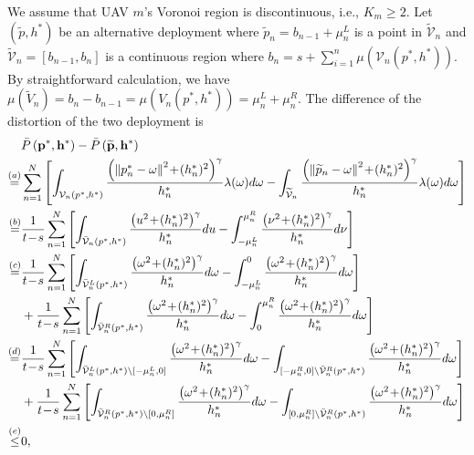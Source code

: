 \documentclass[smallabstract,smallcaptions]{dccpaper}
\newcommand{\df}{\ensuremath{\lam}}         %
\newcommand{\bP}{\ensuremath{\vp}}          %
\newcommand{\abPo}{\ensuremath{\bar{P}}}  %
\newcommand{\bH}{\ensuremath{\vh}}          %
\newcommand{\Vor}{\ensuremath{\mathcal{V}}}         %
\begin{document}
We assume that UAV $m$'s Voronoi region is discontinuous, i.e., $K_m\ge2$.  Let $(\widetilde{p},h^*)$ be an alternative
deployment where $\widetilde{p}_n=b_{n-1}+\mu^L_{n}$ is a point in $\widetilde{\Vor}_n$ and
$\widetilde{\Vor}_{n}=[b_{n-1}, b_n]$ is a continuous region where
$b_n=s+\sum_{i=1}^{n}\mu\left({\Vor}_{n}(p^*,h^*)\right)$.  By straightforward calculation, we have
$\mu(\widetilde{V}_{n})=b_n-b_{n-1}=\mu({V}_{n}(p^*,h^*))=\mu^L_n+\mu^R_n$.  The difference of the distortion of the two
deployment is
%
\begin{equation}
\begin{aligned}
    &\abPo\left(\bP^*,\bH^*\right) - \abPo\left(\widetilde{\bP},\bH^*\right)\\
    \overset{(a)}{=}&\sum_{n=1}^{N}\left[\int_{\Vor_n\left(p^*, h^*\right)}  \frac{ \left(\Norm{p^*_n- \ome}^2 \!+\!(h^*_n)^2\right)^{\gam}}{h^*_n} \df(\ome)d\ome-\int_{\widetilde{\Vor}_{n}} \frac{ \left(\Norm{\widetilde{p}_n- \ome}^2 \!+\!(h^*_n)^2\right)^{\gam}}{h^*_n} \df(\ome)d\ome\right]\\
    \overset{(b)}{=}&\frac{1}{t\!-\!s}\sum_{n=1}^{N}\left[\int_{\bar{\Vor}_n\left(p^*, h^*\right)}  \frac{ \left(u^2 \!+\!(h^*_n)^2\right)^{\gam}}{h^*_n} du-\int_{-\mu^L_n}^{\mu^R_n} \frac{ \left(\nu^2 \!+\!(h^*_n)^2\right)^{\gam}}{h^*_n} d\nu\right]\\
    \overset{(c)}{=}&\frac{1}{t\!-\!s}\sum_{n=1}^{N}\left[\int_{\bar{\Vor}^L_n\left(p^*, h^*\right)}  \frac{ \left(\ome^2 \!+\!(h^*_n)^2\right)^{\gam}}{h^*_n} d\ome-\int_{-\mu^L_n}^{0} \frac{ \left(\ome^2 \!+\!(h^*_n)^2\right)^{\gam}}{h^*_n} d\ome\right]\\
    &+\frac{1}{t\!-\!s}\sum_{n=1}^{N}\left[\int_{\bar{\Vor}^R_n\left(p^*, h^*\right)}  \frac{ \left(\ome^2 \!+\!(h^*_n)^2\right)^{\gam}}{h^*_n} d\ome-\int_{0}^{\mu^R_n} \frac{ \left(\ome^2 \!+\!(h^*_n)^2\right)^{\gam}}{h^*_n} d\ome\right]\\
    \overset{(d)}{=}&\frac{1}{t\!-\!s}\sum_{n=1}^{N}\left[\int_{\bar{\Vor}^L_n\left(p^*, h^*\right)\setminus[-\mu^L_n, 0]}  \frac{ \left(\ome^2 \!+\!(h^*_n)^2\right)^{\gam}}{h^*_n} d\ome-\int_{[ -\mu^R_n,0]\setminus\bar{\Vor}^R_n\left(p^*, h^*\right)} \frac{ \left(\ome^2 \!+\!(h^*_n)^2\right)^{\gam}}{h^*_n} d\ome\right]\\
    &+\frac{1}{t\!-\!s}\sum_{n=1}^{N}\left[\int_{\bar{\Vor}^R_n\left(p^*, h^*\right)\setminus[0, \mu^R_n]}  \frac{ \left(\ome^2 \!+\!(h^*_n)^2\right)^{\gam}}{h^*_n} d\ome-\int_{[0, \mu^R_n]\setminus\bar{\Vor}^R_n\left(p^*, h^*\right)} \frac{ \left(\ome^2 \!+\!(h^*_n)^2\right)^{\gam}}{h^*_n} d\ome\right]\\
    \overset{(e)}{\le}&0,
\end{aligned}
\end{equation}
\end{document}
